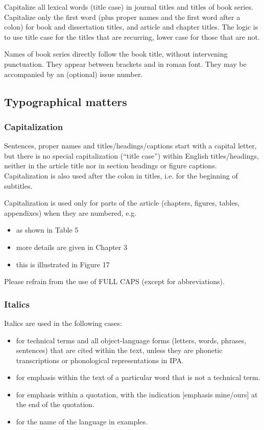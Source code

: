 \documentclass[charis,linguex,biblatex]{glossa}
\begin{document}
Capitalize all lexical words (title case) in journal titles and titles of book series. Capitalize only the first word (plus proper names and the first word after a colon) for book and dissertation titles, and article and chapter titles. The logic is to use title case for the titles that are recurring, lower case for those that are not.

Names of book series directly follow the book title, without intervening punctuation. They appear between brackets and in roman font. They may be accompanied by an (optional) issue number.

\subsection{Typographical matters}

\subsubsection{Capitalization}

Sentences, proper names and titles/headings/captions start with a capital letter, but there is no special capitalization (“title case”) within English titles/headings, neither in the article title nor in section headings or figure captions. Capitalization is also used after the colon in titles, i.e. for the beginning of subtitles.

Capitalization is used only for parts of the article (chapters, figures, tables, appendixes) when they are numbered, e.g.
\begin{itemize}
\item as shown in Table 5
\item more details are given in Chapter 3
\item this is illustrated in Figure 17
\end{itemize}

Please refrain from the use of FULL CAPS (except for abbreviations).

\subsubsection{Italics}
Italics are used in the following cases:
\sloppy
\begin{itemize}
\item for technical terms and all object-language forms (letters, words, phrases, sentences) that are cited within the text, unless they are phonetic transcriptions or phonological representations in IPA.
\item for emphasis within the text of a particular word that is not a technical term.
\item for emphasis within a quotation, with the indication [emphasis mine/ours] at the end of the quotation.
\item for the name of the language in examples.
\end{itemize}
\end{document}
